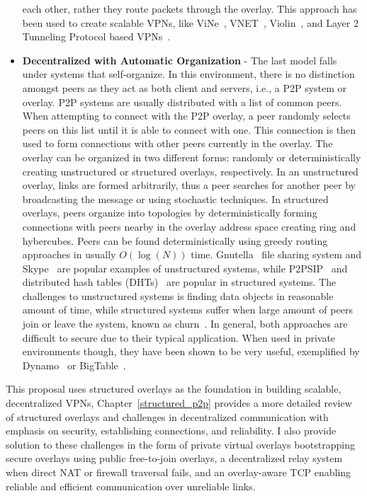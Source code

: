 \begin{itemize}
each other, rather they route packets through the overlay.  This approach has
been used to create scalable VPNs, like ViNe~\cite{vine}, VNET~\cite{vnet},
Violin~\cite{violin}, and Layer 2 Tunneling Protocol based VPNs~\cite{l2tp}.
\item \textbf{Decentralized with Automatic Organization} - The last model falls
under systems that self-organize.  In this environment, there is no distinction
amongst peers as they act as both client and servers, i.e., a P2P system or
overlay.  P2P systems are usually distributed with a list of common peers.  When
attempting to connect with the P2P overlay, a peer randomly selects peers on
this list until it is able to connect with one.  This connection is then used
to form connections with other peers currently in the overlay.  The overlay
can be organized in two different forms: randomly or deterministically
creating unstructured or structured overlays, respectively.  In an unstructured
overlay, links are formed arbitrarily, thus a peer searches for another peer
by broadcasting the message or using stochastic techniques.  In structured
overlays, peers organize into topologies by deterministically forming
connections with peers nearby in the overlay address space creating ring and
hybercubes.  Peers can be found deterministically using greedy routing
approaches in usually $O(\log(N))$ time.  Gnutella~\cite{gnutella} file sharing
system and Skype~\cite{skype} are popular examples of unstructured systems,
while P2PSIP~\cite{p2psip} and distributed hash tables (DHTs)~\cite{chord} are
popular in structured systems.  The challenges to unstructured systems is
finding data objects in reasonable amount of time, while structured systems
suffer when large amount of peers join or leave the system, known as
churn~\cite{opendht}.  In general, both approaches are difficult to secure due
to their typical application.  When used in private environments though, they
have been shown to be very useful, exemplified by Dynamo~\cite{dynamo} or
BigTable~\cite{bigtable}.
\end{itemize}

This proposal uses structured overlays as the foundation in building scalable,
decentralized VPNs, Chapter~\ref{structured_p2p} provides a more detailed
review of structured overlays and challenges in decentralized communication
with emphasis on security, establishing connections, and reliability.  I also
provide solution to these challenges in the form of private virtual overlays
bootstrapping secure overlays using public free-to-join overlays, a
decentralized relay system when direct NAT or firewall traversal fails, and an
overlay-aware TCP enabling reliable and efficient communication over unreliable
links.

